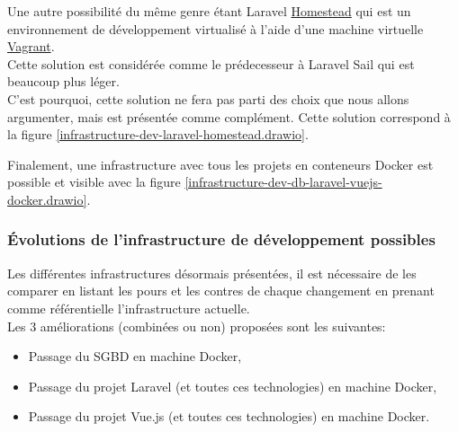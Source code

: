 \documentclass[
    iai, %
    il, %
]{heig-tb}
\begin{document}
Une autre possibilité du même genre étant Laravel
\href{https://laravel.com/docs/9.x/homestead}{Homestead} qui est un environnement de développement
virtualisé à l'aide d'une machine virtuelle \href{https://www.vagrantup.com/}{Vagrant}.\\
Cette solution est considérée comme le prédecesseur à Laravel Sail qui est beaucoup plus léger.\\
C'est pourquoi, cette solution ne fera pas parti des choix que nous allons argumenter, mais est
présentée comme complément. Cette solution correspond à la figure \ref{infrastructure-dev-laravel-homestead.drawio}.

Finalement, une infrastructure avec tous les projets en conteneurs Docker est possible et visible
avec la figure \ref{infrastructure-dev-db-laravel-vuejs-docker.drawio}.


\clearpage

\subsubsection{Évolutions de l'infrastructure de développement possibles}
Les différentes infrastructures désormais présentées, il est nécessaire de les comparer en listant les pours et les contres de chaque changement en prenant comme référentielle l'infrastructure actuelle.\\
Les 3 améliorations (combinées ou non) proposées sont les suivantes:
\begin{itemize}
    \item Passage du SGBD en machine Docker,
    \item Passage du projet Laravel (et toutes ces technologies) en machine Docker,
    \item Passage du projet Vue.js (et toutes ces technologies) en machine Docker.
\end{itemize}
\end{document}
